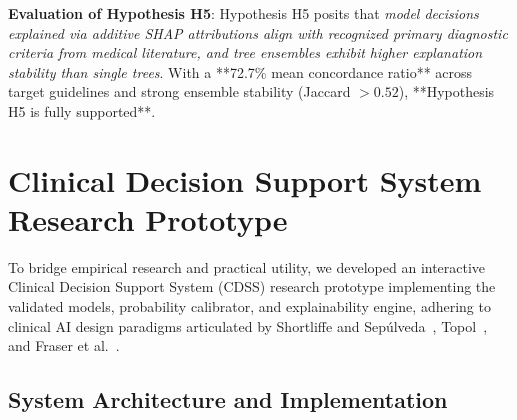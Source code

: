 \noindent\textbf{Evaluation of Hypothesis H5}: Hypothesis H5 posits that \textit{model decisions explained via additive SHAP attributions align with recognized primary diagnostic criteria from medical literature, and tree ensembles exhibit higher explanation stability than single trees}. With a **72.7\% mean concordance ratio** across target guidelines and strong ensemble stability (Jaccard $> 0.52$), **Hypothesis H5 is fully supported**.

\section{Clinical Decision Support System Research Prototype}
\label{sec:prototype}

To bridge empirical research and practical utility, we developed an interactive Clinical Decision Support System (CDSS) research prototype implementing the validated models, probability calibrator, and explainability engine, adhering to clinical AI design paradigms articulated by Shortliffe and Sepúlveda~\cite{shortliffe2018clinical}, Topol~\cite{topol2019high}, and Fraser et al.~\cite{fraser2018evaluating}.

\subsection{System Architecture and Implementation}
\label{subsec:prototype_arch}

